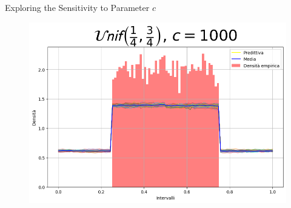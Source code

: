 \documentclass{beamer}
\begin{document}
\begin{frame}{Exploring the Sensitivity to Parameter \(c\)}
\begin{figure}
        \hfill
        \begin{minipage}{0.32\textwidth}
            \centering
            \includegraphics[width=\textwidth]{Unifc1000.png}
        \end{minipage}
    \end{figure}
    \caption{\(Unif(1/4,3/4)\)}


\end{frame}
\end{document}
